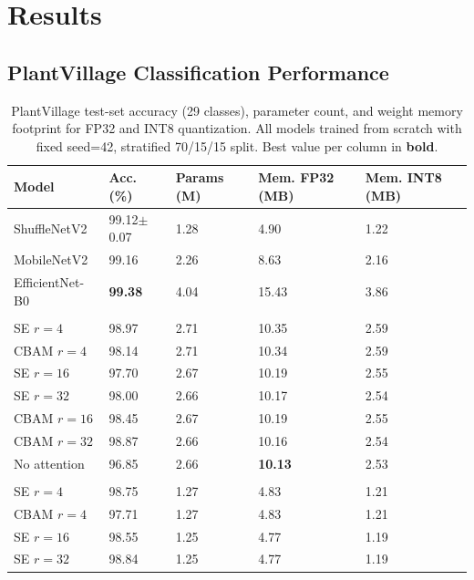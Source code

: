 \documentclass[preprint,12pt]{elsarticle}
\begin{document}
\section{Results}
\label{sec:results}

\subsection{PlantVillage Classification Performance}
\label{sec:pv_results}

\begin{table}[t]
\centering
\caption{PlantVillage test-set accuracy (29 classes), parameter count, and weight memory footprint for FP32 and INT8 quantization. All models trained from scratch with fixed seed=42, stratified 70/15/15 split. Best value per column in \textbf{bold}.}
\label{tab:pv_results}
\begin{tabularx}{\textwidth}{lXXXX}
\toprule
\textbf{Model} & \textbf{Acc. (\%)} & \textbf{Params (M)} & \textbf{Mem. FP32 (MB)} & \textbf{Mem. INT8 (MB)} \\
\midrule
ShuffleNetV2 & 99.12$\pm$0.07 & 1.28 & 4.90 & 1.22 \\
MobileNetV2 & 99.16 & 2.26 & 8.63 & 2.16 \\
EfficientNet-B0 & \textbf{99.38} & 4.04 & 15.43 & 3.86 \\
\addlinespace
\multicolumn{5}{l}{\textit{MobileNetV3 Large}} \\
\quad SE $r=4$ & 98.97 & 2.71 & 10.35 & 2.59 \\
\quad CBAM $r=4$ & 98.14 & 2.71 & 10.34 & 2.59 \\
\quad SE $r=16$ & 97.70 & 2.67 & 10.19 & 2.55 \\
\quad SE $r=32$ & 98.00 & 2.66 & 10.17 & 2.54 \\
\quad CBAM $r=16$ & 98.45 & 2.67 & 10.19 & 2.55 \\
\quad CBAM $r=32$ & 98.87 & 2.66 & 10.16 & 2.54 \\
\quad No attention & 96.85 & 2.66 & \textbf{10.13} & 2.53 \\
\addlinespace
\multicolumn{5}{l}{\textit{MobileNetV3 Small}} \\
\quad SE $r=4$ & 98.75 & 1.27 & 4.83 & 1.21 \\
\quad CBAM $r=4$ & 97.71 & 1.27 & 4.83 & 1.21 \\
\quad SE $r=16$ & 98.55 & 1.25 & 4.77 & 1.19 \\
\quad SE $r=32$ & 98.84 & 1.25 & 4.77 & 1.19 \\

\end{tabularx}
\end{table}
\end{document}
